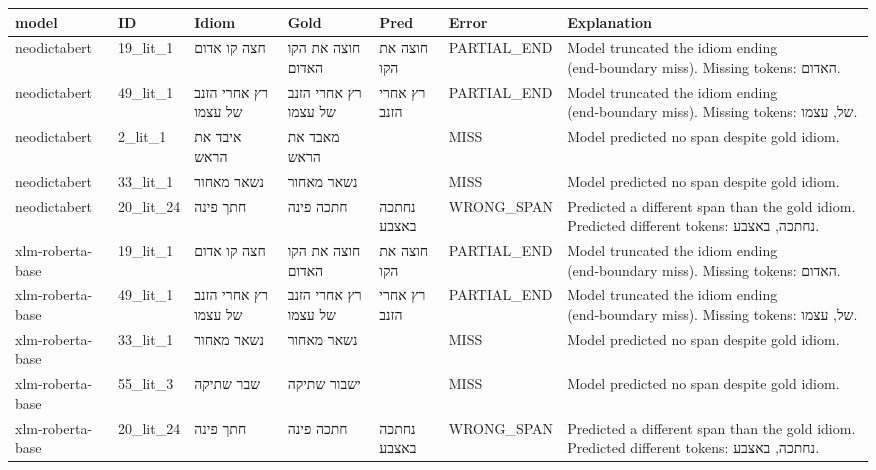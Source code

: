 \begin{tabular}{lllllll}
\toprule
model & ID & Idiom & Gold & Pred & Error & Explanation \\
\midrule
neodictabert & 19\_lit\_1 & חצה קו אדום & חוצה את הקו האדום & חוצה את הקו & PARTIAL\_END & Model truncated the idiom ending (end‑boundary miss). Missing tokens: האדום. \\
neodictabert & 49\_lit\_1 & רץ אחרי הזנב של עצמו & רץ אחרי הזנב של עצמו & רץ אחרי הזנב & PARTIAL\_END & Model truncated the idiom ending (end‑boundary miss). Missing tokens: של, עצמו. \\
neodictabert & 2\_lit\_1 & איבד את הראש & מאבד את הראש &  & MISS & Model predicted no span despite gold idiom. \\
neodictabert & 33\_lit\_1 & נשאר מאחור & נשאר מאחור &  & MISS & Model predicted no span despite gold idiom. \\
neodictabert & 20\_lit\_24 & חתך פינה & חתכה פינה & נחתכה באצבע & WRONG\_SPAN & Predicted a different span than the gold idiom. Predicted different tokens: נחתכה, באצבע. \\
xlm-roberta-base & 19\_lit\_1 & חצה קו אדום & חוצה את הקו האדום & חוצה את הקו & PARTIAL\_END & Model truncated the idiom ending (end‑boundary miss). Missing tokens: האדום. \\
xlm-roberta-base & 49\_lit\_1 & רץ אחרי הזנב של עצמו & רץ אחרי הזנב של עצמו & רץ אחרי הזנב & PARTIAL\_END & Model truncated the idiom ending (end‑boundary miss). Missing tokens: של, עצמו. \\
xlm-roberta-base & 33\_lit\_1 & נשאר מאחור & נשאר מאחור &  & MISS & Model predicted no span despite gold idiom. \\
xlm-roberta-base & 55\_lit\_3 & שבר שתיקה & ישבור שתיקה &  & MISS & Model predicted no span despite gold idiom. \\
xlm-roberta-base & 20\_lit\_24 & חתך פינה & חתכה פינה & נחתכה באצבע & WRONG\_SPAN & Predicted a different span than the gold idiom. Predicted different tokens: נחתכה, באצבע. \\
\bottomrule
\end{tabular}

